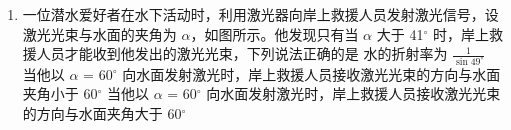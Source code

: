 \documentclass[\gkver]{gaokaozhenti}
\begin{document}
\begin{enumerate}
{再根据  $qvB = m \frac{v^2}{r}$，可知粒子半径变为原来的  $\frac{4}{\sqrt{3}} > 2$，则粒子从 OF 边射出，根据几何关系可知转过的圆心角为  $60^\circ$，根据  $qvB = m \frac{4\pi^2}{T^2} r$，有

 $t = \frac{4\sqrt{3}\pi m}{9qB_2}$

则  $t = \frac{8\sqrt{3}t_0}{9}$

C 错误；

D. 若仅将区域Ⅱ中磁感应强度大小变为  $\frac{2}{4}B_2$，则粒子在 AC 做直线运动的速度仍为  $v_0$，

再根据  $qvB = m \frac{v^2}{r}$，可知粒子半径变为原来的  $\frac{4}{\sqrt{2}} > 2$，则粒子 OF 边射出，根据几何关系

可知转过的圆心角为  $45^\circ$，根据  $qvB = m \frac{4\pi^2}{T^2} r$，有

 $t = \frac{\sqrt{2}\pi m}{2qB_2}$

则  $t = 2t_0$

D 正确。

故选 D。

}

\item
一位潜水爱好者在水下活动时，利用激光器向岸上救援人员发射激光信号，设激光光束与水面的夹角为 $\alpha$，如图所示。他发现只有当 $\alpha$ 大于 41${^\circ}$ 时，岸上救援人员才能收到他发出的激光光束，下列说法正确的是
{水的折射率为 $\frac{1}{{\sin 49^\circ }}$}
{当他以 $\alpha$ = 60${^\circ}$ 向水面发射激光时，岸上救援人员接收激光光束的方向与水面夹角小于 60${^\circ}$}
{当他以 $\alpha$ = 60${^\circ}$ 向水面发射激光时，岸上救援人员接收激光光束的方向与水面夹角大于 60${^\circ}$}
\end{enumerate}
\end{document}
